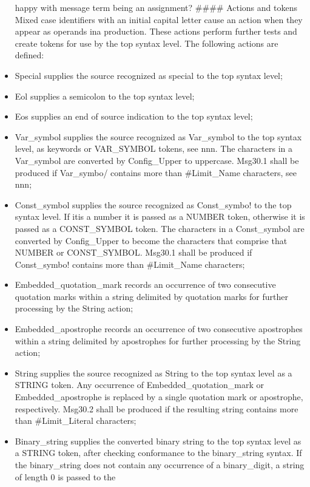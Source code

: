 \begin{itemize}
  happy with message term being an assignment? \#\#\#\# Actions and
  tokens Mixed case identifiers with an initial capital letter cause an
  action when they appear as operands ina production. These actions
  perform further tests and create tokens for use by the top syntax
  level. The following actions are defined:
\item
  Special supplies the source recognized as special to the top syntax
  level;
\item
  Eol supplies a semicolon to the top syntax level;
\item
  Eos supplies an end of source indication to the top syntax level;
\item
  Var\_symbol supplies the source recognized as Var\_symbol to the top
  syntax level, as keywords or VAR\_SYMBOL tokens, see nnn. The
  characters in a Var\_symbol are converted by Config\_Upper to
  uppercase. Msg30.1 shall be produced if Var\_symbo/ contains more than
  \#Limit\_Name characters, see nnn;
\item
  Const\_symbol supplies the source recognized as Const\_symbo! to the
  top syntax level. If itis a number it is passed as a NUMBER token,
  otherwise it is passed as a CONST\_SYMBOL token. The characters in a
  Const\_symbol are converted by Config\_Upper to become the characters
  that comprise that NUMBER or CONST\_SYMBOL. Msg30.1 shall be produced
  if Const\_symbo! contains more than \#Limit\_Name characters;
\item
  Embedded\_quotation\_mark records an occurrence of two consecutive
  quotation marks within a string delimited by quotation marks for
  further processing by the String action;
\item
  Embedded\_apostrophe records an occurrence of two consecutive
  apostrophes within a string delimited by apostrophes for further
  processing by the String action;
\item
  String supplies the source recognized as String to the top syntax
  level as a STRING token. Any occurrence of Embedded\_quotation\_mark
  or Embedded\_apostrophe is replaced by a single quotation mark or
  apostrophe, respectively. Msg30.2 shall be produced if the resulting
  string contains more than \#Limit\_Literal characters;
\item
  Binary\_string supplies the converted binary string to the top syntax
  level as a STRING token, after checking conformance to the
  binary\_string syntax. If the binary\_string does not contain any
  occurrence of a binary\_digit, a string of length 0 is passed to the

\end{itemize}
